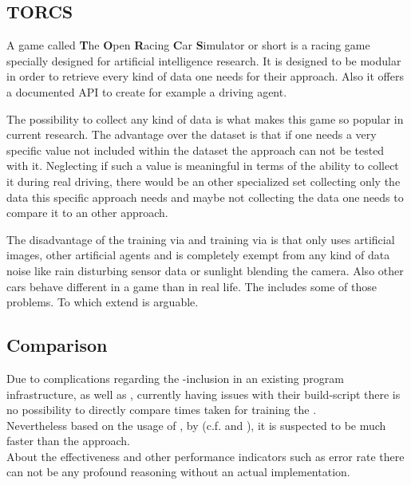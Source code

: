 \subsection{TORCS} \label{subsec: TORCS}

A game called \textbf{T}he \textbf{O}pen \textbf{R}acing \textbf{C}ar \textbf{S}imulator or short \torcs is a racing game specially designed for artificial intelligence research. It is designed to be modular in order to retrieve every kind of data one needs for their approach. Also it offers a documented API to create for example a driving agent. 

The possibility to collect any kind of data is what makes this game so popular in current research. The advantage over the \kitti dataset is that if one needs a very specific value not included within the \kitti dataset the approach can not be tested with it. Neglecting if such a value is meaningful in terms of the ability to collect it during real driving, there would be an other specialized set collecting only the data this specific approach needs and maybe not collecting the data one needs to compare it to an other approach.

The disadvantage of the training via \torcs and training via \kitti is that \torcs only uses artificial images, other artificial agents and is completely exempt from any kind of data noise like rain disturbing sensor data or sunlight blending the camera. Also other cars behave different in a game than in real life. The \kitti includes some of those problems. To which extend is arguable. \cite{wymann2000torcs}

\subsection{Comparison}
Due to complications regarding the \cnnarch-inclusion in an existing program infrastructure, as well as \caffe, currently having issues with their build-script there is no possibility to directly compare times taken for training the \nn. \\
Nevertheless based on the usage of \mxnet, by \cnnarch (c.f.  and ), it is suspected to be much faster than the \caffe approach.\\
About the effectiveness and other performance indicators such as error rate there can not be any profound reasoning without an actual implementation.